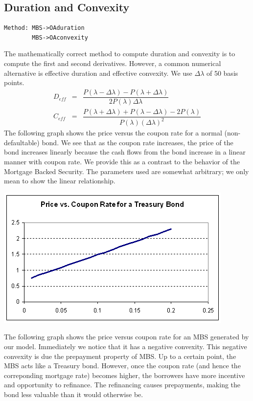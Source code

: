 \documentclass[10pt,letterpaper]{article}
\begin{document}
\subsection{Duration and Convexity}
\begin{verbatim}Method: MBS->OAduration 
        MBS->OAconvexity \end{verbatim}
The mathematically correct method to compute duration and convexity is to compute the first and second derivatives. However, a common numerical alternative is effective duration and effective convexity. We use $\Delta \lambda$ of 50 basis points.
\begin{eqnarray}
D_{eff} & = & \dfrac{P(\lambda - \Delta \lambda) - P(\lambda + \Delta \lambda)}{2P(\lambda)\Delta \lambda}\\
C_{eff} & = & \dfrac{P(\lambda + \Delta \lambda) + P(\lambda - \Delta \lambda) - 2P(\lambda)}{P(\lambda)(\Delta \lambda)^2}
\end{eqnarray}
The following graph shows the price versus the coupon rate for a normal (non-defaultable) bond. We see that as the coupon rate increases, the price of the bond increases linearly because the cash flows from the bond increase in a linear manner with coupon rate. We provide this as a contrast to the behavior of the Mortgage Backed Security. The parameters used are somewhat arbitrary; we only mean to show the linear relationship.
\begin{center}
\includegraphics[scale=0.7]{regbond.png}\\
\end{center}
The following graph shows the price versus coupon rate for an MBS generated by our model. Immediately we notice that it has a negative convexity. This negative convexity is due the prepayment property of MBS. Up to a certain point, the MBS acts like a Treasury bond. However, once the coupon rate (and hence the correponding mortgage rate) becomes higher, the borrowers have more incentive and opportunity to refinance. The refinancing causes prepayments, making the bond less valuable than it would otherwise be.
\end{document}
